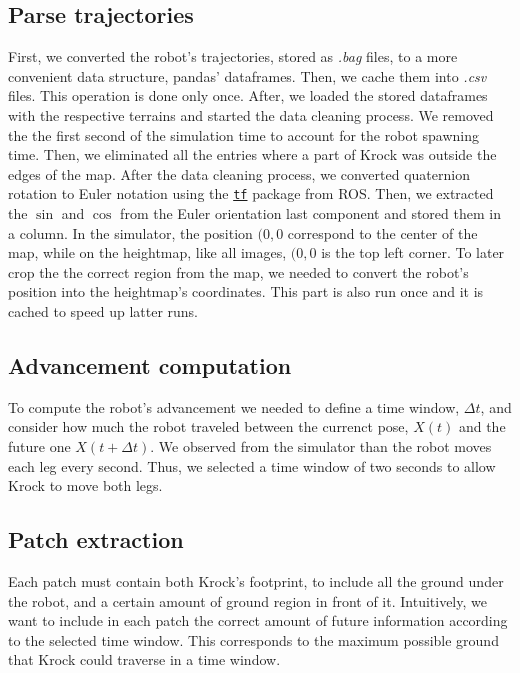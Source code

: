 \documentclass[../document.tex]{subfiles}
\begin{document}
\subsection{Parse trajectories}
First, we converted the robot's trajectories, stored as \emph{.bag} files, to a more convenient data structure, pandas' dataframes. Then, we cache them into \emph{.csv} files. This operation is done only once.
After, we loaded the stored dataframes with the respective terrains and started the data cleaning process. We removed the the first second of the simulation time to account for the robot spawning time. Then, we eliminated all the entries where a part of Krock was outside the edges of the map. After the data cleaning process, we converted quaternion rotation to Euler notation using the \href{https://duckduckgo.com/?q=ros+tf&atb=v154-1__&ia=web}{\texttt{tf}} package from ROS. Then, we extracted the $\sin$ and $\cos$ from the Euler orientation last component and stored them in a column. In the simulator, the position $(0,0$ correspond to the center of the map, while on the heightmap, like all images, $(0,0$ is the top left corner. To later crop the the correct region from the map, we needed to convert the robot's position into the heightmap's coordinates. This part is also run once and it is cached to speed up latter runs.

\subsection{Advancement computation}
To compute the robot's advancement we needed to define a time window, $\Delta t$, and consider how much the robot traveled between the currenct pose, $X(t)$ and the future one $X(t + \Delta t)$. We observed from the simulator than the robot moves each leg every second. Thus, we selected a time window of two seconds to allow Krock to move both legs. 

\subsection{Patch extraction}
Each patch must contain both Krock's footprint, to include all the ground under the robot, and a certain amount of ground region in front of it. Intuitively, we want to include in each patch the correct amount of future information according to the selected time window. This corresponds to the maximum possible ground that Krock could traverse in a time window.  
\end{document}
